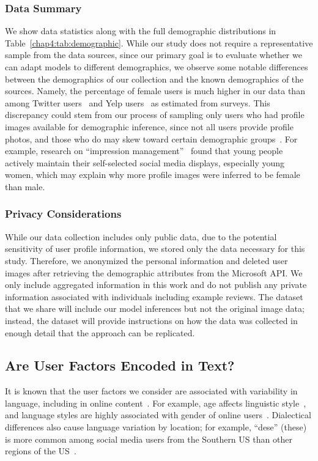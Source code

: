 \subsubsection{Data Summary}
We show data statistics along with the full demographic distributions in Table~\ref{chap4:tab:demographic}.
While our study does not require a representative sample from the data sources,
since our primary goal is to evaluate whether we can adapt models to different demographics,
we observe some notable differences between the demographics of our collection and the known demographics of the sources.
Namely, the percentage of female users is much higher in our data than among Twitter users~\cite{fontein2016top} and Yelp users~\cite{yelp_2018} as estimated from surveys. 
This discrepancy could stem from our process of sampling only users who had profile images available for demographic inference,
since not all users provide profile photos,
and those who do may skew toward certain demographic groups~\cite{rose2012face}.
For example, research on ``impression management''~\cite{rose2012face} found that young people actively maintain their self-selected social media displays, especially young women, which may explain why more profile images were inferred to be female than male.

\subsubsection{Privacy Considerations}

While our data collection includes only public data, 
due to the potential sensitivity of user profile information,
we stored only the data necessary for this study.
Therefore, we anonymized the personal information and deleted user images after retrieving the demographic attributes from the Microsoft API. 
We only include aggregated information in this work and do not publish any private information associated with individuals including example reviews. 
The dataset that we share will include our model inferences but not the original image data; instead, the dataset will provide 
instructions on how the data was collected in enough detail that the approach can be replicated.


\subsection{Are User Factors Encoded in Text?}
\label{chap4:subsec:analysis}

It is known that the user factors we consider are associated with variability in language, including in online content~\cite{hovy2015demographic}.
For example, age affects linguistic style~\cite{wagner2012age},
and language styles are highly associated with gender of online users~\cite{hovy2018capturing}.
Dialectical differences also cause language variation by location;
for example, ``dese'' (these) is more common among social media users from the Southern US than other regions of the US~\cite{goel2016social}.

